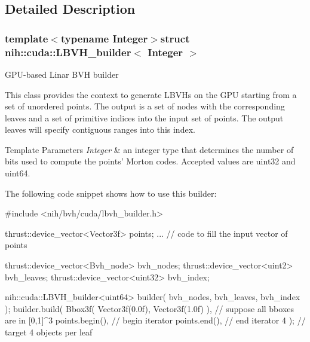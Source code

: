 \subsection{\-Detailed \-Description}
\subsubsection*{template$<$typename Integer$>$struct nih\-::cuda\-::\-L\-B\-V\-H\-\_\-builder$<$ Integer $>$}

\-G\-P\-U-\/based \-Linar \-B\-V\-H builder

\-This class provides the context to generate \-L\-B\-V\-Hs on the \-G\-P\-U starting from a set of unordered points. \-The output is a set of nodes with the corresponding leaves and a set of primitive indices into the input set of points. \-The output leaves will specify contiguous ranges into this index.


\begin{DoxyTemplParams}{\-Template Parameters}
{\em \-Integer} & an integer type that determines the number of bits used to compute the points' \-Morton codes. \-Accepted values are uint32 and uint64.\\
\hline
\end{DoxyTemplParams}
\-The following code snippet shows how to use this builder\-:


\begin{DoxyCode}
 #include <nih/bvh/cuda/lbvh_builder.h>

 thrust::device_vector<Vector3f> points;
 ... // code to fill the input vector of points

 thrust::device_vector<Bvh_node> bvh_nodes;
 thrust::device_vector<uint2>    bvh_leaves;
 thrust::device_vector<uint32>   bvh_index;

 nih::cuda::LBVH_builder<uint64> builder( bvh_nodes, bvh_leaves, bvh_index );
 builder.build(
     Bbox3f( Vector3f(0.0f), Vector3f(1.0f) ),   // suppose all bboxes are in
       [0,1]^3
     points.begin(),                             // begin iterator
     points.end(),                               // end iterator
     4 );                                        // target 4 objects per leaf
\end{DoxyCode}
 

